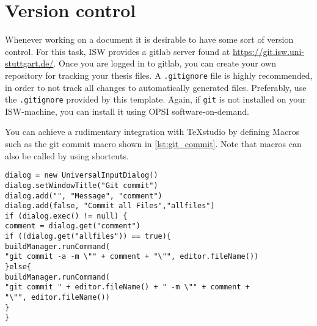 \section{Version control}
\label{sec:version_control}
Whenever working on a document it is desirable to have some sort of version control. For this task, \ac{ISW} provides a gitlab server found at \url{https://git.isw.uni-stuttgart.de/}. Once you are logged in to gitlab, you can create your own repository for tracking your thesis files. A \texttt{.gitignore} file is highly recommended, in order to not track all changes to automatically generated files. Preferably, use the \texttt{.gitignore} provided by this template. Again, if \texttt{git} is not installed on your \ac{ISW}-machine, you can install it using OPSI software-on-demand.

You can achieve a rudimentary integration with TeXstudio by defining Macros such as the git commit macro shown in \autoref{lst:git_commit}. Note that macros can also be called by using shortcuts.

\begin{lstlisting}[caption={\texttt{git commit} macro}, label={lst:git_commit}]
%SCRIPT
dialog = new UniversalInputDialog()
dialog.setWindowTitle("Git commit")
dialog.add("", "Message", "comment")
dialog.add(false, "Commit all Files","allfiles")
if (dialog.exec() != null) {
comment = dialog.get("comment")
if ((dialog.get("allfiles")) == true){
buildManager.runCommand(
"git commit -a -m \"" + comment + "\"", editor.fileName())
}else{
buildManager.runCommand(
"git commit " + editor.fileName() + " -m \"" + comment +
"\"", editor.fileName())
}
}
\end{lstlisting}

